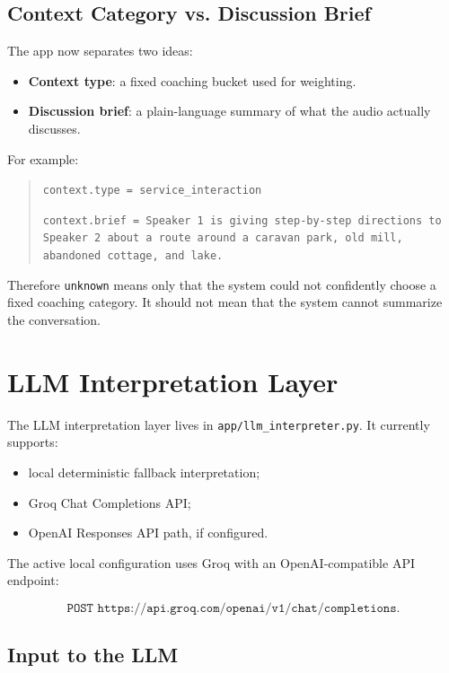 \documentclass[11pt]{article}
\begin{document}
\subsection{Context Category vs. Discussion Brief}

The app now separates two ideas:

\begin{itemize}[leftmargin=*]
  \item \textbf{Context type}: a fixed coaching bucket used for weighting.
  \item \textbf{Discussion brief}: a plain-language summary of what the audio actually discusses.
\end{itemize}

For example:

\begin{quote}
\texttt{context.type = service\_interaction}

\texttt{context.brief = Speaker 1 is giving step-by-step directions to Speaker 2 about a route around a caravan park, old mill, abandoned cottage, and lake.}
\end{quote}

Therefore \texttt{unknown} means only that the system could not confidently choose a fixed coaching category. It should not mean that the system cannot summarize the conversation.

\section{LLM Interpretation Layer}

The LLM interpretation layer lives in \texttt{app/llm\_interpreter.py}. It currently supports:

\begin{itemize}[leftmargin=*]
  \item local deterministic fallback interpretation;
  \item Groq Chat Completions API;
  \item OpenAI Responses API path, if configured.
\end{itemize}

The active local configuration uses Groq with an OpenAI-compatible API endpoint:

\[
\texttt{POST https://api.groq.com/openai/v1/chat/completions}.
\]

\subsection{Input to the LLM}
\end{document}
